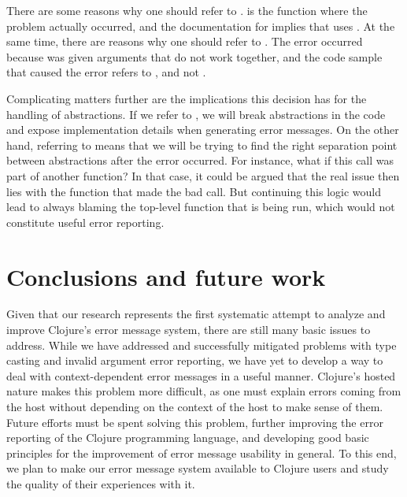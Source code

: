 \documentclass[12pt]{article}
\begin{document}
There are some reasons why one should refer to  .  is the function where the problem actually occurred, and the
documentation for  implies that  uses . At the
same time, there are reasons why one should refer to . The error
occurred because  was given arguments that do not work together, and
the code sample that caused the error refers to , and not
.

Complicating matters further are the implications this decision has for
the handling of abstractions. If we refer to , we will
break abstractions in the code and expose implementation details when generating
error messages. On the other hand, referring to  means that
we will be 
trying to find the right separation point between abstractions after the error
occurred. For instance, what if this  call was part of another
function? In that case, it could be argued that the real issue then lies with
the function that made the bad  call. But continuing this logic would
lead to always blaming the top-level function that is being run, which would
not constitute useful error reporting.

\section{Conclusions and future work}
Given that our research represents the first systematic attempt to analyze and improve Clojure's error message system, there are still many basic issues to address. While we have addressed and successfully mitigated problems with type casting and invalid argument error reporting, we have yet to develop a way to deal with context-dependent error messages in a useful manner. Clojure's hosted nature makes this problem more difficult, as one must explain errors coming from the host without depending on the context of the host to make sense of them. Future efforts must be spent solving this problem, further improving the error reporting of the Clojure programming language, and developing good basic principles for the improvement of error message usability in general. To this end, we plan to make our error message system available to Clojure users and study the quality of their experiences with it.
\end{document}
